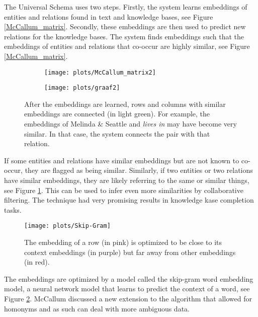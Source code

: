 \documentclass{article}
\begin{document}
The Universal Schema uses two steps. Firstly, the system learns embeddings of entities and relations found in text and knowledge bases\cite{universalschema}, see Figure \ref{McCallum_matrix}. Secondly, these embeddings are then used to predict new relations for the knowledge bases. The system finds embeddings such that the embeddings of entities and relations that co-occur are highly similar, see Figure \ref{McCallum_matrix}.

 \begin{figure}[H]
 \centering
 \begin{subfigure}{0.475\textwidth}
 \texttt{[image: plots/McCallum\_matrix2]}
 \end{subfigure}
 \begin{subfigure}{0.475\textwidth}
 \texttt{[image: plots/graaf2]}
 \end{subfigure}
 \caption[Universal Schema predictions]{After the embeddings are learned, rows and columns with similar embeddings are connected (in light green).
 For example, the embeddings of Melinda \& Seattle and \emph{lives in} may have become very similar. In that case, the system connects the pair with that relation.}
 \label{McCallum_matrix2}
 \end{figure}
 
 If some entities and relations have similar embeddings but are not known to co-occur, they are flagged as being similar. Similarly, if two entities or two relations have similar embeddings, they are likely referring to the same or similar things, see Figure \ref{McCallum_matrix2}. This can be used to infer even more similarities by collaborative filtering. The technique had very promising results in knowledge kase completion tasks.
  
 \begin{figure}[H]
 \centering
 \texttt{[image: plots/Skip-Gram]}
 \caption[Skip-Gram model]{The embedding of a row (in pink) is optimized to be close to its context embeddings (in purple) but far away from other embeddings (in red).}
 \label{Skip-Gram-img}
 \end{figure}
 
 The embeddings are optimized by a model called the skip-gram word embedding model\cite{w2v}, a neural network model that learns to predict the context of a word, see Figure \ref{Skip-Gram-img}. McCallum discussed a new extension to the algorithm that allowed for homonyms and as such can deal with more ambiguous data\cite{mccallumweblecture}.
  
\end{document}
